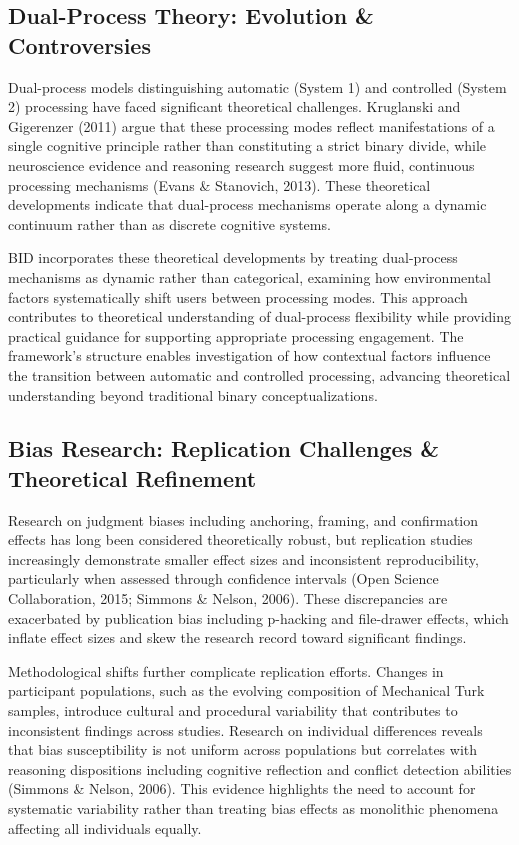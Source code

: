 \documentclass[
  authoryear,
  preprint]{elsarticle}
\begin{document}
\subsection{Dual-Process Theory: Evolution \&
Controversies}\label{dual-process-theory-evolution-controversies}

Dual-process models distinguishing automatic (System 1) and controlled
(System 2) processing have faced significant theoretical challenges.
Kruglanski and Gigerenzer (2011) argue that these processing modes
reflect manifestations of a single cognitive principle rather than
constituting a strict binary divide, while neuroscience evidence and
reasoning research suggest more fluid, continuous processing mechanisms
(Evans \& Stanovich, 2013). These theoretical developments indicate that
dual-process mechanisms operate along a dynamic continuum rather than as
discrete cognitive systems.

BID incorporates these theoretical developments by treating dual-process
mechanisms as dynamic rather than categorical, examining how
environmental factors systematically shift users between processing
modes. This approach contributes to theoretical understanding of
dual-process flexibility while providing practical guidance for
supporting appropriate processing engagement. The framework's structure
enables investigation of how contextual factors influence the transition
between automatic and controlled processing, advancing theoretical
understanding beyond traditional binary conceptualizations.

\subsection{Bias Research: Replication Challenges \& Theoretical
Refinement}\label{bias-research-replication-challenges-theoretical-refinement}

Research on judgment biases including anchoring, framing, and
confirmation effects has long been considered theoretically robust, but
replication studies increasingly demonstrate smaller effect sizes and
inconsistent reproducibility, particularly when assessed through
confidence intervals (Open Science Collaboration, 2015; Simmons \&
Nelson, 2006). These discrepancies are exacerbated by publication bias
including p-hacking and file-drawer effects, which inflate effect sizes
and skew the research record toward significant findings.

Methodological shifts further complicate replication efforts. Changes in
participant populations, such as the evolving composition of Mechanical
Turk samples, introduce cultural and procedural variability that
contributes to inconsistent findings across studies. Research on
individual differences reveals that bias susceptibility is not uniform
across populations but correlates with reasoning dispositions including
cognitive reflection and conflict detection abilities (Simmons \&
Nelson, 2006). This evidence highlights the need to account for
systematic variability rather than treating bias effects as monolithic
phenomena affecting all individuals equally.
\end{document}
